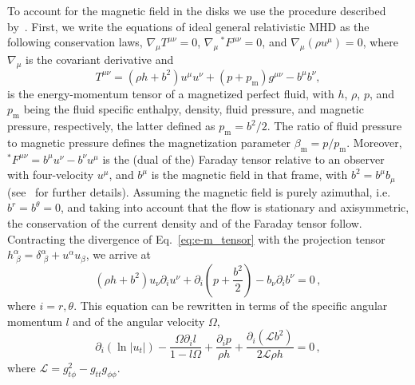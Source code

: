 \documentclass[twocolumn,aps,showpacs,showkeys,prd,superscriptaddress,byrevtex, amsmath]{revtex4-1}
\begin{document}
To account for the magnetic field in the disks we use the procedure described by~\cite{Komissarov:2006,Montero:2007}. First, we write the equations of ideal general relativistic MHD as the following conservation laws, $\nabla_{\mu} T^{\mu\nu} = 0$, $\nabla_{\mu} \,^\ast F^{\mu\nu} = 0$, and 
$\nabla_{\mu} (\rho u^{\mu}) = 0$, 
where $\nabla_{\mu}$ is the covariant derivative and
\begin{equation}\label{eq:e-m_tensor}
T^{\mu\nu} = (\rho h + b^2)u^{\mu}u^{\nu} + (p + p_{\mathrm{m}})g^{\mu\nu} - b^{\mu}b^{\nu},
\end{equation}
is the energy-momentum tensor of a magnetized perfect fluid, with $h$, $\rho$, $p$, and $p_{\mathrm{m}}$ being the fluid specific enthalpy, density, fluid pressure, and magnetic pressure, respectively, the latter defined as $p_{\mathrm{m}} = b^2/2$. The ratio of fluid pressure to magnetic pressure defines the magnetization parameter $\beta_{\mathrm{m}} = p/p_{\mathrm{m}}$.
Moreover, $^\ast F^{\mu\nu} = b^{\mu}u^{\nu} - b^{\nu}u^{\mu}$ is the (dual of the) Faraday tensor relative to an observer with 
four-velocity $u^{\mu}$, and $b^{\mu}$ is the magnetic field in that frame, with
$b^2=b^{\mu}b_{\mu}$ (see~\cite{Anton:2006} for further details). Assuming the magnetic field is purely azimuthal, i.e.~$b^r = b^{\theta} = 0$,
and taking into account that the flow is stationary and axisymmetric, the conservation of the current density and of the Faraday tensor follow. Contracting the divergence of Eq.~\eqref{eq:e-m_tensor} with the projection tensor $h^{\alpha}_{\,\,\beta} = \delta^{\alpha}_{\,\,\beta} + u^{\alpha}u_{\beta}$, we arrive at
\begin{equation}
(\rho h + b^2)u_{\nu}\partial_i u^{\nu} + \partial_i\left(p + \frac{b^2}{2}\right) - b_{\nu}\partial_i b^{\nu}=0\,,
\end{equation}
where $i = r, \theta$. This equation can be rewritten in terms of the specific angular momentum $l$ and of the angular velocity $\Omega$, 
\begin{equation}\label{eq:diff_ver}
\partial_i(\ln |u_t|) - \frac{\Omega \partial_i l}{1-l\Omega} + \frac{\partial_i p}{\rho h} + \frac{\partial_i(\mathcal{L}b^2)}{2\mathcal{L}\rho h} = 0\,,
\end{equation}
where $\mathcal{L} = g_{t\phi}^2 - g_{tt}g_{\phi\phi}$.
\end{document}
